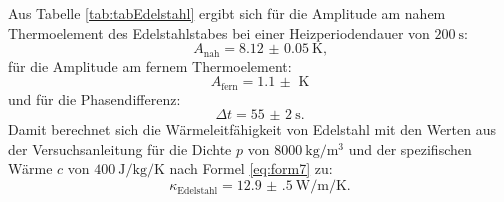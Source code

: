Aus Tabelle \ref{tab:tabEdelstahl} ergibt sich für die Amplitude am nahem Thermoelement des Edelstahlstabes bei einer Heizperiodendauer von $\SI{200}{\second}$:
\begin{displaymath}
A_\text{nah} = \SI{8.12(5)}{\kelvin}\text{,}
\end{displaymath}
für die Amplitude am fernem Thermoelement:
\begin{displaymath}
A_\text{fern} = \SI{1.1(0)}{\kelvin}
\end{displaymath}
und für die Phasendifferenz:
\begin{displaymath}
\Delta t = \SI{55(2)}{\second}\text{.}
\end{displaymath}
Damit berechnet sich die Wärmeleitfähigkeit von Edelstahl mit den Werten aus der Versuchsanleitung \cite{V204} für die Dichte $p$ von $\SI{8000}{\kilo\gram\per\meter\tothe{3}}$ und der spezifischen Wärme $c$ von $\SI{400}{\joule\per\kilo\gram\per\kelvin}$ nach Formel \eqref{eq:form7} zu:
\begin{displaymath}
\kappa_\text{Edelstahl} = \SI{12.9(5)}{\watt\per\meter\per\kelvin}\text{.}
\end{displaymath}